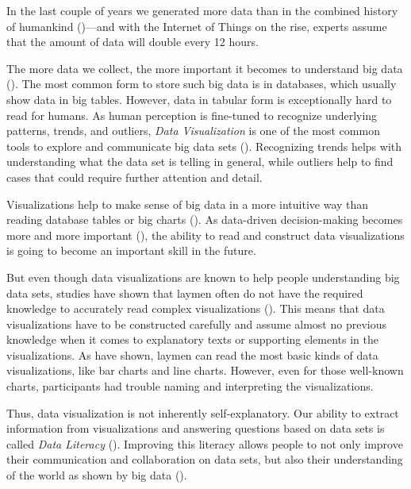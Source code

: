 
In the last couple of years we generated more data than in the combined history of humankind (\cite{helbing2019will})---and with the Internet of Things on the rise, experts assume that the amount of data will double every 12 hours.

The more data we collect, the more important it becomes to understand big data (\cite{bornerDataVisualizationLiteracy2019}). The most common form to store such big data is in databases, which usually show data in big tables. However, data in tabular form is exceptionally hard to read for humans. As human perception is fine-tuned to recognize underlying patterns, trends, and outliers, \emph{Data Visualization} is one of the most common tools to explore and communicate big data sets (\cite{heerTourVisualizationZoo2010}). Recognizing trends helps with understanding what the data set is telling in general, while outliers help to find cases that could require further attention and detail.

Visualizations help to make sense of big data in a more intuitive way than reading database tables or big charts (\cite{donalekImmersiveCollaborativeData2014}). As data-driven decision-making becomes more and more important (\cite{brynjolfssonStrengthNumbersHow2011}), the ability to read and construct data visualizations is going to become an important skill in the future.

But even though data visualizations are known to help people understanding big data sets, studies have shown that laymen often do not have the required knowledge to accurately read complex visualizations (\cite{bornerInvestigatingAspectsData2016}). This means that data visualizations have to be constructed carefully and assume almost no previous knowledge when it comes to explanatory texts or supporting elements in the visualizations. As \citeauthor{bornerInvestigatingAspectsData2016} have shown, laymen can read the most basic kinds of data visualizations, like bar charts and line charts. However, even for those well-known charts, participants had trouble naming and interpreting the visualizations.

Thus, data visualization is not inherently self-explanatory. Our ability to extract information from visualizations and answering questions based on data sets is called \emph{Data Literacy} (\cite{boyPrincipledWayAssessing2014}). Improving this literacy allows people to not only improve their communication and collaboration on data sets, but also their understanding of the world as shown by big data (\cite{bornerDataVisualizationLiteracy2019}). 

